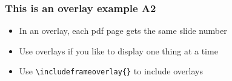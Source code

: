 \begin{frame}
\frametitle{This is an overlay example A2}
\begin{itemize}[<+->]
  \item In an overlay, each pdf page gets the same slide number
  \item Use overlays if you like to display one thing at a time
  \item Use \texttt{\textbackslash includeframeoverlay\{\}} to include overlays
\end{itemize}
\end{frame}
